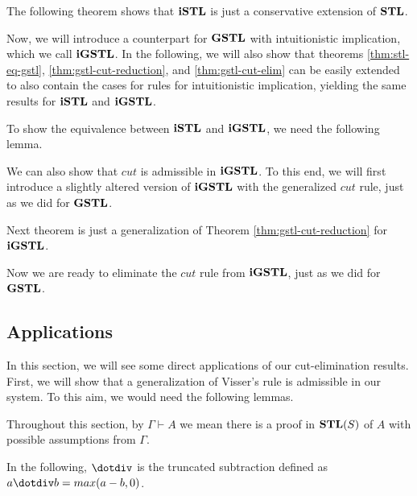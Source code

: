 \documentclass[12pt,a4paper]{article}
\begin{document}
The following theorem shows that $\mathbf{iSTL}$ is just a conservative extension of $\mathbf{STL}$.



Now, we will introduce a counterpart for $\mathbf{GSTL}$ with intuitionistic implication, which we call $\mathbf{iGSTL}$. In the following, we will also show that theorems \ref{thm:stl-eq-gstl}, \ref{thm:gstl-cut-reduction}, and \ref{thm:gstl-cut-elim} can be easily extended to also contain the cases for rules for intuitionistic implication, yielding the same results for $\mathbf{iSTL}$ and $\mathbf{iGSTL}$.



To show the equivalence between $\mathbf{iSTL}$ and $\mathbf{iGSTL}$, we need the following lemma.





We can also show that $cut$ is admissible in $\mathbf{iGSTL}$. To this end, we will first introduce a slightly altered version of $\mathbf{iGSTL}$ with the generalized $cut$ rule, just as we did for $\mathbf{GSTL}$.







Next theorem is just a generalization of Theorem \ref{thm:gstl-cut-reduction} for $\mathbf{iGSTL}$.



Now we are ready to eliminate the $cut$ rule from $\mathbf{iGSTL}$, just as we did for $\mathbf{GSTL}$.



\subsection{Applications}
In this section, we will see some direct applications of our cut-elimination results. First, we will show that a generalization of Visser's rule is admissible in our system. To this aim, we would need the following lemmas.

Throughout this section, by $\Gamma \vdash A$ we mean there is a proof in $\mathbf{STL}(S)$ of $A$ with possible assumptions from $\Gamma$.







\begin{rem}
	In the following, $\dotdiv$ is the truncated subtraction defined as $a \dotdiv b = max(a-b, 0)$.
\end{rem}
\end{document}
